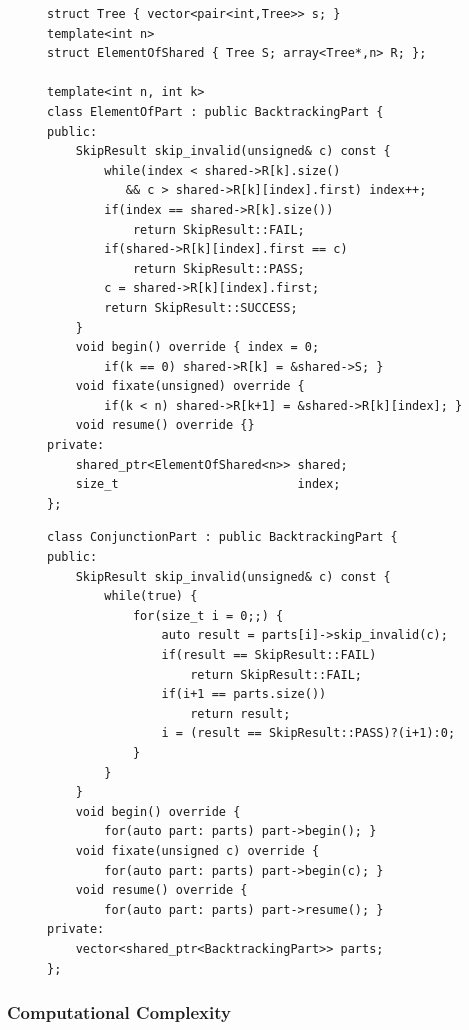 \begin{figure}[p]
\begin{lstlisting}[language=MyCpp,basicstyle=\linespread{0.90}\ttfamily]
struct Tree { vector<pair<int,Tree>> s; }
template<int n>
struct ElementOfShared { Tree S; array<Tree*,n> R; };

template<int n, int k>
class ElementOfPart : public BacktrackingPart {
public:
    SkipResult skip_invalid(unsigned& c) const {
        while(index < shared->R[k].size()
           && c > shared->R[k][index].first) index++;
        if(index == shared->R[k].size())
            return SkipResult::FAIL;
        if(shared->R[k][index].first == c)
            return SkipResult::PASS;
        c = shared->R[k][index].first;
        return SkipResult::SUCCESS;
    }
    void begin() override { index = 0;
        if(k == 0) shared->R[k] = &shared->S; }
    void fixate(unsigned) override {
        if(k < n) shared->R[k+1] = &shared->R[k][index]; }
    void resume() override {}
private:
    shared_ptr<ElementOfShared<n>> shared;
    size_t                         index;
};
\end{lstlisting}
\begin{lstlisting}[language=MyCpp,basicstyle=\linespread{0.90}\ttfamily,
                   label={partimplementations},caption=
   {{\tt BacktrackingPart} is implemented for element-of constraints and
    conjunction constraints.
    The struct {\tt ElementOfShared} corresponds to
    $\protect{(R_k[E_S](M,x))_{k=1\dots n}}$ in \Cref{theo:theo1}.
    \parfillskip=0pt}]
class ConjunctionPart : public BacktrackingPart {
public:
    SkipResult skip_invalid(unsigned& c) const {
        while(true) {
            for(size_t i = 0;;) {
                auto result = parts[i]->skip_invalid(c);
                if(result == SkipResult::FAIL)
                    return SkipResult::FAIL;
                if(i+1 == parts.size())
                    return result;
                i = (result == SkipResult::PASS)?(i+1):0;
            }
        }
    }
    void begin() override {
        for(auto part: parts) part->begin(); }
    void fixate(unsigned c) override {
        for(auto part: parts) part->begin(c); }
    void resume() override {
        for(auto part: parts) part->resume(); }
private:
    vector<shared_ptr<BacktrackingPart>> parts;
};
\end{lstlisting}
\end{figure}

\subsubsection{Computational Complexity}

